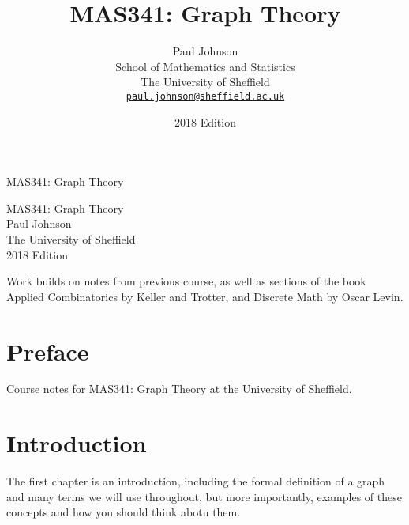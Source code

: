 \documentclass[10pt,]{book}
\title{MAS341: Graph Theory}
\author{Paul Johnson\\
School of Mathematics and Statistics\\
The University of Sheffield\\
\href{mailto:paul.johnson@sheffield.ac.uk}{\nolinkurl{paul.johnson@sheffield.ac.uk}}
}
\date{2018 Edition}
\theoremstyle{plain}
\theoremstyle{definition}
\theoremstyle{definition}
\begin{document}
\frontmatter
\thispagestyle{empty}
{\centering
\vspace*{0.28\textheight}
{\Huge MAS341: Graph Theory}\\}
\clearpage
\thispagestyle{empty}
\null%
\clearpage
\thispagestyle{empty}
{\centering
\vspace*{0.14\textheight}
{\Huge MAS341: Graph Theory}\\[3\baselineskip]
{\Large Paul Johnson}\\[0.5\baselineskip]
{\Large The University of Sheffield}\\[3\baselineskip]
{\Large 2018 Edition}\\}
\clearpage
\thispagestyle{empty}
\null\clearpage
\hypertarget{p-1}{}%
Work builds on notes from previous course, as well as sections of the book Applied Combinatorics by Keller and Trotter, and Discrete Math by Oscar Levin.%
\chapter*{Preface}\label{preface-1}
Course notes for MAS341: Graph Theory at the University of Sheffield.%
\setcounter{tocdepth}{1}
\renewcommand*\contentsname{Contents}
\tableofcontents
\mainmatter
\typeout{************************************************}
\typeout{************************************************}
\chapter[{Introduction}]{Introduction}\label{ch_intro}
\hypertarget{p-2}{}%
The first chapter is an introduction, including the formal definition of a graph and many terms we will use throughout, but more importantly, examples of these concepts and how you should think abotu them.%
\typeout{************************************************}
\typeout{************************************************}
\end{document}
